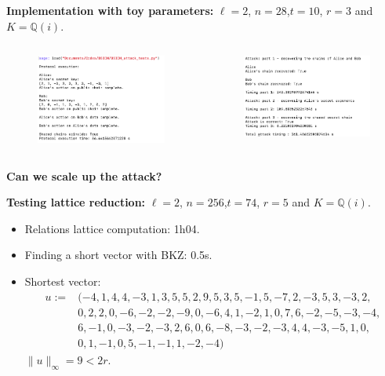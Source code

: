 \documentclass[10pt]{beamer}
\theoremstyle{plain}
\theoremstyle{definition}
\newcommand{\Q}{\mathbb{Q}}
\renewcommand{\(}{\left(}
\renewcommand{\)}{\right)}
\begin{document}
\begin{frame}
\textbf{Implementation with toy parameters:} $\ell=2$, $n=28$,$t=10$, $r=3$ and $K=\Q(i)$.

\begin{columns}[t]
\begin{figure}
\includegraphics[width=5.5cm]
{Protocol_execution.png} 
\end{figure}



\begin{figure}
\includegraphics[width=5.5cm]
{Attack_execution.png} 

\end{figure}
\end{columns}

\end{frame}

\begin{frame}
\textbf{Can we scale up the attack?} 

\vspace{0.5cm}

\textbf{Testing lattice reduction:} $\ell=2$, $n=256$,$t=74$, $r=5$ and $K=\Q(i)$.

\begin{itemize}
\item Relations lattice computation: 1h04.
\item Finding a short vector with BKZ: 0.5s.
\item Shortest vector:
\begin{align*}u:=&(-4, 1, 4, 4, -3, 1, 3, 5, 5, 2, 9, 5, 3, 5, -1, 5, -7, 2, -3, 5, 3, -3, 2,\\
&0, 2, 2, 0, -6, -2, -2, -9, 0, -6, 4, 1, -2, 1, 0, 7, 6, -2, -5, -3, -4, \\
&6, -1, 0, -3,-2, -3, 2, 6, 0, 6, -8, -3, -2, -3, 4, 4, -3, -5, 1, 0, \\
&0, 1, -1, 0, 5, -1, -1, 1, -2, -4)\end{align*}
$\|u\|_\infty=9<2r$.
\end{itemize}
\end{frame}
\end{document}
